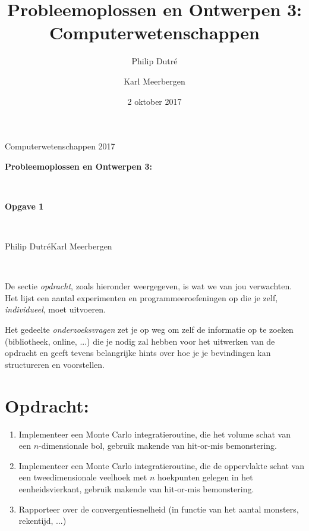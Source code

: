 \documentclass[10pt,a4paper]{article}
\title{Probleemoplossen en Ontwerpen 3: Computerwetenschappen}
\author{Philip Dutr\'e \and Karl Meerbergen}
\date{2 oktober 2017}
\begin{document}
\pagestyle{empty}

\begin{flushright}
	Computerwetenschappen 2017\\[1cm]
\end{flushright}
\begin{center}%
	\begin{huge}
		\textbf{Probleemoplossen en Ontwerpen 3:}
	\end{huge}\\[0.25cm]
	\begin{huge}
		\textbf{\textemdash Opgave 1\textemdash}
	\end{huge}\\[0.75cm]
	\begin{large}
	Philip Dutr\'e\hspace{1cm}Karl Meerbergen
	\end{large}\\[0.75cm]
\end{center}

De sectie \emph{opdracht}, zoals hieronder weergegeven, is wat we van jou verwachten.
Het lijst een aantal experimenten en programmeeroefeningen op die je zelf, \emph{individueel}, moet uitvoeren.

Het gedeelte \emph{onderzoeksvragen} zet je op weg om zelf de informatie op te zoeken (bibliotheek, online, ...) die je nodig zal hebben voor het uitwerken van de opdracht en geeft tevens belangrijke hints over hoe je je bevindingen kan structureren en voorstellen.

\section*{Opdracht:}

\begin{enumerate}
	\item Implementeer een Monte Carlo integratieroutine, die het volume schat van een $n$-dimensionale bol, gebruik makende van hit-or-mis bemonstering.
	\item Implementeer een Monte Carlo integratieroutine, die de oppervlakte schat van een tweedimensionale veelhoek met $n$ hoekpunten gelegen in het eenheidsvierkant, gebruik makende van hit-or-mis bemonstering.
	\item Rapporteer over de convergentiesnelheid (in functie van het aantal monsters, rekentijd, ...)
\end{enumerate}
\end{document}
